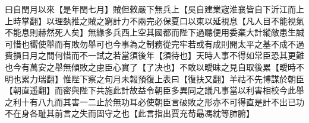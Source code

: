 曰自閏月以來【是年閏七月】賊但敕嚴下無兵上【吳自建業宼淮襄皆自下沂江而上上時掌翻】以理埶推之賊之窮計力不兩完必保夏口以東以延視息【凡人目不能視氣不能息則赫然死人矣】無緣多兵西上空其國都而陛下過聽便用委棄大計縱敵患生誠可惜也嚮使舉而有敗勿舉可也今事為之制務從完牢若或有成則開太平之基不成不過費損日月之間何惜而不一試之若當須後年【須待也】天時人事不得如常臣恐其更難也今有萬安之舉無傾敗之慮臣心實了【了决也】不敢以曖昧之見自取後累【曖時不明也累力瑞翻】惟陛下察之旬月未報預復上表曰【復扶又翻】羊祜不先博謀於朝臣【朝直遥翻】而密與陛下共施此計故益令朝臣多異同之議凡事當以利害相校今此舉之利十有八九而其害一二止於無功耳必使朝臣言破敗之形亦不可得直是計不出已功不在身各耻其前言之失而固守之也【此言指出賈充荀朂馮紞等肺腑】
